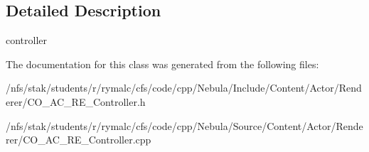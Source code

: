 \subsection{Detailed Description}
controller 

The documentation for this class was generated from the following files:\begin{DoxyCompactItemize}
\item 
/nfs/stak/students/r/rymalc/cfs/code/cpp/Nebula/Include/Content/Actor/Renderer/CO\_\-AC\_\-RE\_\-Controller.h\item 
/nfs/stak/students/r/rymalc/cfs/code/cpp/Nebula/Source/Content/Actor/Renderer/CO\_\-AC\_\-RE\_\-Controller.cpp\end{DoxyCompactItemize}
